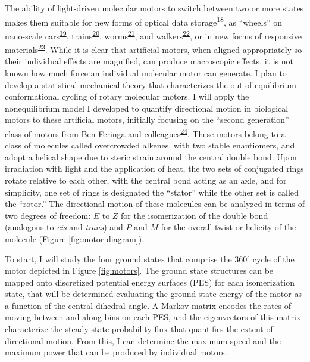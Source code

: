 \documentclass[11pt,notitlepage]{article}
\begin{document}
The ability of light-driven molecular motors to switch between two or
more states makes them suitable for new forms of optical data
storage\textsuperscript{\protect\hyperlink{ref-18PGyWtWV}{18}}, as
``wheels'' on nano-scale
cars\textsuperscript{\protect\hyperlink{ref-OAnfwOYX}{19}},
trains\textsuperscript{\protect\hyperlink{ref-10MPrT2Vf}{20}},
worms\textsuperscript{\protect\hyperlink{ref-Tels98bO}{21}}, and
walkers\textsuperscript{\protect\hyperlink{ref-SfUEsk0e}{22}}, or in new
forms of responsive
materials\textsuperscript{\protect\hyperlink{ref-jCuccJLJ}{23}}. While
it is clear that artificial motors, when aligned appropriately so their
individual effects are magnified, can produce macroscopic effects, it is
not known how much force an individual molecular motor can generate. I
plan to develop a statistical mechanical theory that characterizes the
out-of-equilibrium conformational cycling of rotary molecular motors. I
will apply the nonequilibrium model I developed to quantify directional
motion in biological motors to these artificial motors, initially
focusing on the ``second generation'' class of motors from Ben Feringa
and colleagues\textsuperscript{\protect\hyperlink{ref-FwAqK1Dt}{24}}.
These motors belong to a class of molecules called overcrowded alkenes,
with two stable enantiomers, and adopt a helical shape due to steric
strain around the central double bond. Upon irradiation with light and
the application of heat, the two sets of conjugated rings rotate
relative to each other, with the central bond acting as an axle, and for
simplicity, one set of rings is designated the ``stator'' while the
other set is called the ``rotor.'' The directional motion of these
molecules can be analyzed in terms of two degrees of freedom: \(E\) to
\(Z\) for the isomerization of the double bond (analogous to \emph{cis}
and \emph{trans}) and \(P\) and \(M\) for the overall twist or helicity
of the molecule (Figure \ref{fig:motor-diagram}).

To start, I will study the four ground states that comprise the
360\(^\circ\) cycle of the motor depicted in Figure \ref{fig:motors}.
The ground state structures can be mapped onto discretized potential
energy surfaces (PES) for each isomerization state, that will be
determined evaluating the ground state energy of the motor as a function
of the central dihedral angle. A Markov matrix encodes the rates of
moving between and along bins on each PES, and the eigenvectors of this
matrix characterize the steady state probability flux that quantifies
the extent of directional motion. From this, I can determine the maximum
speed and the maximum power that can be produced by individual motors.
\end{document}
